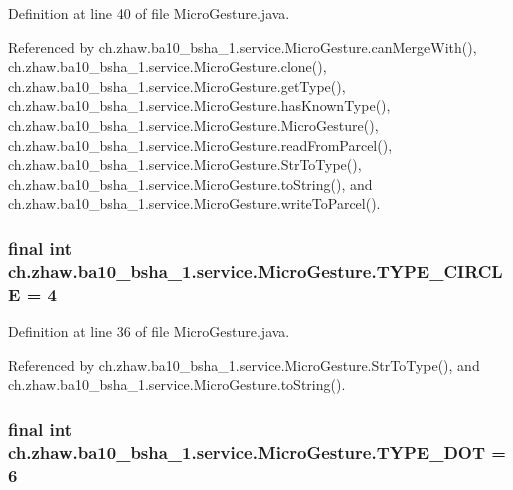 Definition at line 40 of file MicroGesture.java.

Referenced by ch.zhaw.ba10\_\-bsha\_\-1.service.MicroGesture.canMergeWith(), ch.zhaw.ba10\_\-bsha\_\-1.service.MicroGesture.clone(), ch.zhaw.ba10\_\-bsha\_\-1.service.MicroGesture.getType(), ch.zhaw.ba10\_\-bsha\_\-1.service.MicroGesture.hasKnownType(), ch.zhaw.ba10\_\-bsha\_\-1.service.MicroGesture.MicroGesture(), ch.zhaw.ba10\_\-bsha\_\-1.service.MicroGesture.readFromParcel(), ch.zhaw.ba10\_\-bsha\_\-1.service.MicroGesture.StrToType(), ch.zhaw.ba10\_\-bsha\_\-1.service.MicroGesture.toString(), and ch.zhaw.ba10\_\-bsha\_\-1.service.MicroGesture.writeToParcel().\hypertarget{classch_1_1zhaw_1_1ba10__bsha__1_1_1service_1_1MicroGesture_ac8268cb939b8bae2cf1791b4bbeb422d}{
\subsubsection[{TYPE\_\-CIRCLE}]{\setlength{\rightskip}{0pt plus 5cm}final int {\bf ch.zhaw.ba10\_\-bsha\_\-1.service.MicroGesture.TYPE\_\-CIRCLE} = 4}}
\label{classch_1_1zhaw_1_1ba10__bsha__1_1_1service_1_1MicroGesture_ac8268cb939b8bae2cf1791b4bbeb422d}


Definition at line 36 of file MicroGesture.java.

Referenced by ch.zhaw.ba10\_\-bsha\_\-1.service.MicroGesture.StrToType(), and ch.zhaw.ba10\_\-bsha\_\-1.service.MicroGesture.toString().\hypertarget{classch_1_1zhaw_1_1ba10__bsha__1_1_1service_1_1MicroGesture_a18689e75216da1fea6b0706ca6fc95fe}{
\subsubsection[{TYPE\_\-DOT}]{\setlength{\rightskip}{0pt plus 5cm}final int {\bf ch.zhaw.ba10\_\-bsha\_\-1.service.MicroGesture.TYPE\_\-DOT} = 6}}
\label{classch_1_1zhaw_1_1ba10__bsha__1_1_1service_1_1MicroGesture_a18689e75216da1fea6b0706ca6fc95fe}


